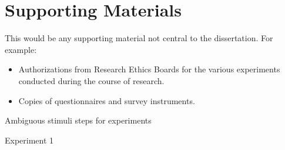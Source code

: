 \chapter{Supporting Materials}

This would be any supporting material not central to the dissertation.
For example:
\begin{itemize}
\item Authorizations from Research Ethics Boards for the various
    experiments conducted during the course of research.
\item Copies of questionnaires and survey instruments.
\end{itemize}


Ambiguous stimuli steps for experiments

Experiment 1

\begin{tabular}


\end{tabular}
